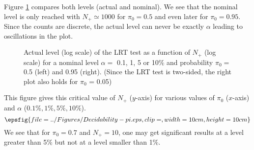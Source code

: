 \documentclass[dvips, lscape]{foils}
\newcommand{\textblue}[1]{\textcolor{blue}{#1}}
\newcommand{\subsection}[1]{\noindent{\large \textblue{#1}}}
\begin{document}
Figure \ref{Fig:FitLRTChi2} compares both levels (actual and nominal).
We see that the nominal level is only reached with $N_+ \simeq 1000$
for $\pi_0 = 0.5$ and even later for $\pi_0 = 0.95$.  Since the counts are
discrete, the actual level can never be exactly $\alpha$ leading to
oscillations in the plot.

\begin{figure}[h]
  \begin{center}
    \caption{Actual level (log scale) of the LRT test as a function of $N_+$
      (log scale) for a nominal level $\alpha = $ 0.1, 1, 5 or 10\%
      and probability $\pi_0 =$ 0.5 (left) and 0.95 (right). (Since the
      LRT test is two-sided, the right plot also holds for $\pi_0$ = 0.05)}
    \label{Fig:FitLRTChi2} 
  \end{center}
\end{figure}

\newpage
\subsection{Decidability limits for the binomial test}

This figure gives this critical value of $N_+$ ($y$-axis) for various
values of $\pi_0$ ($x$-axis) and $\alpha$ ($0.1\%, 1\%, 5\%, 10\%$).
$$
  \epsfig{file = ../Figures/Decidability-pi.eps, clip=, width=10cm,
    height=10cm}
$$
We see that for $\pi_0 = 0.7$ and $N_+ = 10$, one may get significant
results at a level greater than 5\% but not at a level smaller than
1\%.

\newpage
\end{document}
